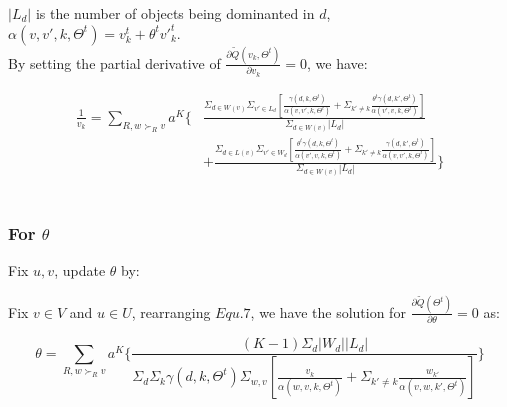 \documentclass{article}
\begin{document}
 $|L_d|$ is the number of objects being dominanted in $d$,
 \\ $\alpha(v,v',k,\Theta^t)=v_k^t + \theta^t {v'}_k^t$.
 \\
By setting the partial derivative of $\frac{\partial \tilde{Q}(v_k,\Theta^t)}{\partial v_k}=0$, we have:



\begin{equation}
\begin{aligned}
\frac{1}{v_k}=\sum_{R,w \succ_R v} a^K \{ &\frac{\Sigma_{d\in W(v)}\Sigma_{v'\in L_d} [\frac{\gamma(d,k,\Theta^t)}{ \alpha(v,v',k,\Theta^t)} +\Sigma_{k'\neq k}\frac{\theta^t\gamma(d,k',\Theta^t)}{\alpha(v',v,k,\Theta^t)}]}{\Sigma_{d\in W(v)}|L_d|}\\\nonumber
 & + \frac{\Sigma_{d\in L(v)}\Sigma_{v'\in W_d} [\frac{\theta^t \gamma(d,k,\Theta^t)}{\alpha(v',v,k,\Theta^t)}+\Sigma_{k'\neq k} \frac{\gamma(d,k',\Theta^t)}{\alpha(v,v',k,\Theta^t)}] }{\Sigma_{d\in W(v)}|L_d|}\}
\end{aligned}
\end{equation}\\

\subsubsection{For $\theta$}
Fix $u,v$, update $\theta$ by:

  Fix $v \in V$ and $u \in U$, rearranging $Equ.7$, we have the solution for $\frac{\partial \tilde{Q}(\Theta^t)}{\partial \theta}=0$ as:

 \begin{equation}
\theta = \sum_{R,w \succ_R v} a^K \{\frac{(K-1)\Sigma_d |W_d| |L_d|}{\Sigma_d \Sigma_k \gamma(d,k,\Theta^t) \Sigma_{w,v} [\frac{v_k}{\alpha(w,v,k,\Theta^t)}+\Sigma_{k'\neq k} \frac{w_{k'}}{\alpha(v,w,k',\Theta^t)}]} \}
 \end{equation}
\end{document}
